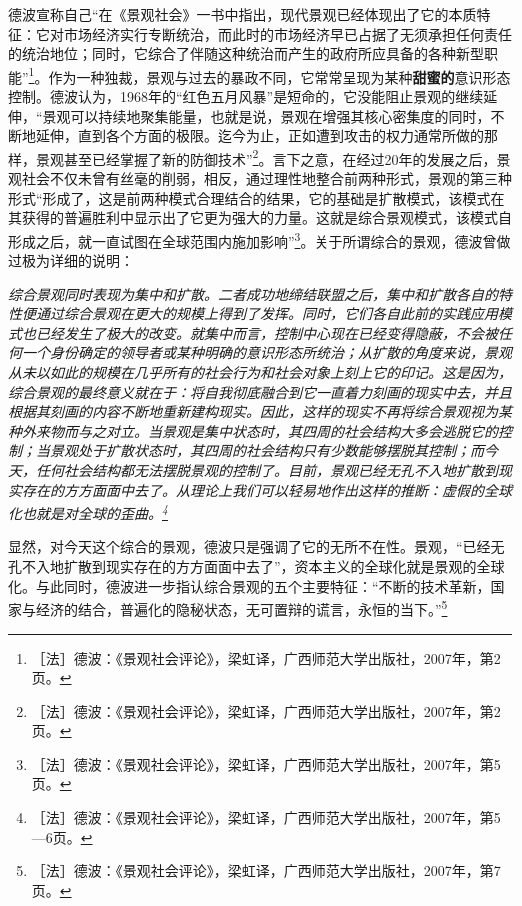 \documentclass[fontset=fandol, a4paper, 12pt, openright]{ctexbook}
\renewenvironment{quote}
  {\list{}{\rightmargin\leftmargin}%
   \item\relax\small\itshape\color{darkgray}}
  {\endlist}
\begin{document}
德波宣称自己“在《景观社会》一书中指出，现代景观已经体现出了它的本质特征：它对市场经济实行专断统治，而此时的市场经济早已占据了无须承担任何责任的统治地位；同时，它综合了伴随这种统治而产生的政府所应具备的各种新型职能”\footnote{［法］德波：《景观社会评论》，梁虹译，广西师范大学出版社，2007年，第2页。}。作为一种独裁，景观与过去的暴政不同，它常常呈现为某种\textbf{甜蜜的}意识形态控制。德波认为，1968年的“红色五月风暴”是短命的，它没能阻止景观的继续延伸，“景观可以持续地聚集能量，也就是说，景观在增强其核心密集度的同时，不断地延伸，直到各个方面的极限。迄今为止，正如遭到攻击的权力通常所做的那样，景观甚至已经掌握了新的防御技术”\footnote{［法］德波：《景观社会评论》，梁虹译，广西师范大学出版社，2007年，第2页。}。言下之意，在经过20年的发展之后，景观社会不仅未曾有丝毫的削弱，相反，通过理性地整合前两种形式，景观的第三种形式“形成了，这是前两种模式合理结合的结果，它的基础是扩散模式，该模式在其获得的普遍胜利中显示出了它更为强大的力量。这就是综合景观模式，该模式自形成之后，就一直试图在全球范围内施加影响”\footnote{［法］德波：《景观社会评论》，梁虹译，广西师范大学出版社，2007年，第5页。}。关于所谓综合的景观，德波曾做过极为详细的说明：

\begin{quote}
综合景观同时表现为集中和扩散。二者成功地缔结联盟之后，集中和扩散各自的特性便通过综合景观在更大的规模上得到了发挥。同时，它们各自此前的实践应用模式也已经发生了极大的改变。就集中而言，控制中心现在已经变得隐蔽，不会被任何一个身份确定的领导者或某种明确的意识形态所统治；从扩散的角度来说，景观从未以如此的规模在几乎所有的社会行为和社会对象上刻上它的印记。这是因为，综合景观的最终意义就在于：将自我彻底融合到它一直着力刻画的现实中去，并且根据其刻画的内容不断地重新建构现实。因此，这样的现实不再将综合景观视为某种外来物而与之对立。当景观是集中状态时，其四周的社会结构大多会逃脱它的控制；当景观处于扩散状态时，其四周的社会结构只有少数能够摆脱其控制；而今天，任何社会结构都无法摆脱景观的控制了。目前，景观已经无孔不入地扩散到现实存在的方方面面中去了。从理论上我们可以轻易地作出这样的推断：虚假的全球化也就是对全球的歪曲。\footnote{［法］德波：《景观社会评论》，梁虹译，广西师范大学出版社，2007年，第5—6页。}
\end{quote}

显然，对今天这个综合的景观，德波只是强调了它的无所不在性。景观，“已经无孔不入地扩散到现实存在的方方面面中去了”，资本主义的全球化就是景观的全球化。与此同时，德波进一步指认综合景观的五个主要特征：“不断的技术革新，国家与经济的结合，普遍化的隐秘状态，无可置辩的谎言，永恒的当下。”\footnote{［法］德波：《景观社会评论》，梁虹译，广西师范大学出版社，2007年，第7页。}
\end{document}
